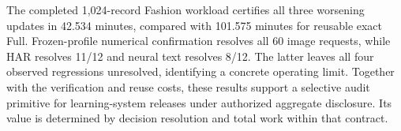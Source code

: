 The completed 1,024-record Fashion workload certifies all three worsening
updates in 42.534 minutes, compared with 101.575 minutes for reusable exact
Full. Frozen-profile numerical confirmation resolves all 60 image requests,
while HAR resolves 11/12 and neural text resolves 8/12. The latter leaves
all four observed regressions unresolved, identifying a concrete operating
limit. Together with the verification and reuse costs, these results
support a selective audit primitive for learning-system releases under
authorized aggregate disclosure. Its value is determined by decision
resolution and total work within that contract.
